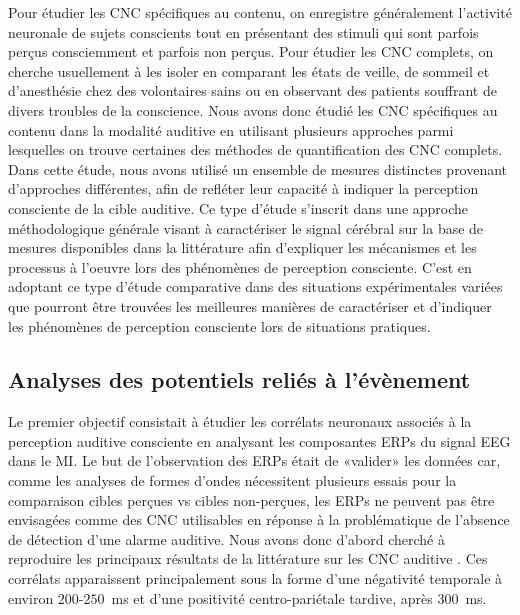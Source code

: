 Pour étudier les CNC spécifiques au contenu, on enregistre généralement l'activité neuronale de sujets conscients tout en présentant des stimuli qui sont parfois perçus consciemment et parfois non perçus. 
Pour étudier les CNC complets, on cherche usuellement à les isoler en comparant les états de veille, de sommeil et d'anesthésie chez des volontaires sains ou en observant des patients souffrant de divers troubles de la conscience. 
Nous avons donc étudié les CNC spécifiques au contenu dans la modalité auditive en utilisant plusieurs approches parmi lesquelles on trouve certaines des méthodes de quantification des CNC complets. 
Dans cette étude, nous avons utilisé un ensemble de mesures distinctes provenant d'approches différentes, afin de refléter leur capacité à indiquer la perception consciente de la cible auditive. 
Ce type d'étude s'inscrit dans une approche méthodologique générale visant à caractériser le signal cérébral sur la base de mesures disponibles dans la littérature afin d'expliquer les mécanismes et les processus à l'oeuvre lors des phénomènes de perception consciente. 
C'est en adoptant ce type d'étude comparative dans des situations expérimentales variées que pourront être trouvées les meilleures manières de caractériser et d'indiquer les phénomènes de perception consciente lors de situations pratiques. 

\subsection{Analyses des potentiels reliés à l'évènement}

Le premier objectif consistait à étudier les corrélats neuronaux associés à la perception auditive consciente en analysant les composantes ERPs du signal EEG dans le MI. 
Le but de l'observation des ERPs était de «valider» les données car, comme les analyses de formes d'ondes nécessitent plusieurs essais pour la comparaison cibles perçues vs cibles non-perçues, les ERPs ne peuvent pas être envisagées comme des CNC utilisables en réponse à la problématique de l'absence de détection d'une alarme auditive. 
Nous avons donc d'abord cherché à reproduire les principaux résultats de la littérature sur les CNC auditive \citep{dykstra2016neural, gartner2021auditory, giani2015detecting, gutschalk2008neural, wiegand2012correlates}. 
Ces corrélats apparaissent principalement sous la forme d'une négativité temporale à environ $200$-$250$~ms et d'une positivité centro-pariétale tardive, après $300$~ms. 

